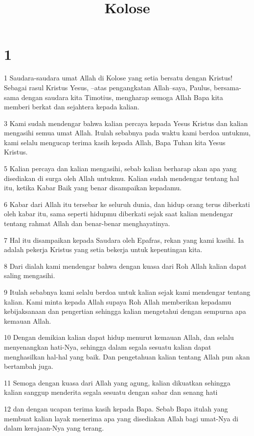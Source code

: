 

\title{Kolose}


\chapter{1}

\par 1 Saudara-saudara umat Allah di Kolose yang setia bersatu dengan Kristus! Sebagai rasul Kristus Yesus, --atas pengangkatan Allah--saya, Paulus, bersama-sama dengan saudara kita Timotius, mengharap semoga Allah Bapa kita memberi berkat dan sejahtera kepada kalian.
\par 3 Kami sudah mendengar bahwa kalian percaya kepada Yesus Kristus dan kalian mengasihi semua umat Allah. Itulah sebabnya pada waktu kami berdoa untukmu, kami selalu mengucap terima kasih kepada Allah, Bapa Tuhan kita Yesus Kristus.
\par 5 Kalian percaya dan kalian mengasihi, sebab kalian berharap akan apa yang disediakan di surga oleh Allah untukmu. Kalian sudah mendengar tentang hal itu, ketika Kabar Baik yang benar disampaikan kepadamu.
\par 6 Kabar dari Allah itu tersebar ke seluruh dunia, dan hidup orang terus diberkati oleh kabar itu, sama seperti hidupmu diberkati sejak saat kalian mendengar tentang rahmat Allah dan benar-benar menghayatinya.
\par 7 Hal itu disampaikan kepada Saudara oleh Epafras, rekan yang kami kasihi. Ia adalah pekerja Kristus yang setia bekerja untuk kepentingan kita.
\par 8 Dari dialah kami mendengar bahwa dengan kuasa dari Roh Allah kalian dapat saling mengasihi.
\par 9 Itulah sebabnya kami selalu berdoa untuk kalian sejak kami mendengar tentang kalian. Kami minta kepada Allah supaya Roh Allah memberikan kepadamu kebijaksanaan dan pengertian sehingga kalian mengetahui dengan sempurna apa kemauan Allah.
\par 10 Dengan demikian kalian dapat hidup menurut kemauan Allah, dan selalu menyenangkan hati-Nya, sehingga dalam segala sesuatu kalian dapat menghasilkan hal-hal yang baik. Dan pengetahuan kalian tentang Allah pun akan bertambah juga.
\par 11 Semoga dengan kuasa dari Allah yang agung, kalian dikuatkan sehingga kalian sanggup menderita segala sesuatu dengan sabar dan senang hati
\par 12 dan dengan ucapan terima kasih kepada Bapa. Sebab Bapa itulah yang membuat kalian layak menerima apa yang disediakan Allah bagi umat-Nya di dalam kerajaan-Nya yang terang.
